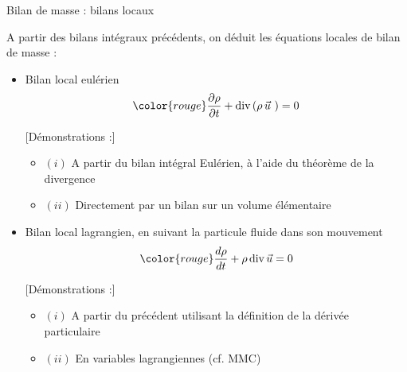 \begin{frame}{Bilan de masse : bilans locaux}

\small

A partir des bilans intégraux précédents, on déduit les équations locales de bilan de masse :

\medskip

\begin{itemize}

\item
  Bilan local eulérien
	\begin{equation}
			\color{rouge}
		\dpdt{\rho} + \divergence ( \rho \, \myvec{u}\ ) = 0
		\label{eq:bilan_local_eulerien_masse}
	\end{equation}
\medskip

\pause 
\textcolor{vert}{[Démonstrations :]}

\begin{itemize}
	\item $(i)$ A partir du bilan intégral Eulérien, à l'aide du théorème de la divergence
	\item $(ii)$ Directement par un bilan sur un volume élémentaire 
\end{itemize}


\pause

\item
	Bilan local lagrangien, en suivant la particule fluide dans son mouvement
	\begin{equation}
		\color{rouge}
		\ddt{\rho} + \rho \, \divergence \myvec{u} = 0
		\label{eq:bilan_local_lagrangien_masse}
	\end{equation}
\pause

\textcolor{vert}{[Démonstrations :] }
\begin{itemize}
	\item $(i)$ A partir du précédent utilisant la définition de la dérivée particulaire
	\item $(ii)$ En variables lagrangiennes (cf. MMC) 
\end{itemize}


\end{itemize}
\end{frame}



